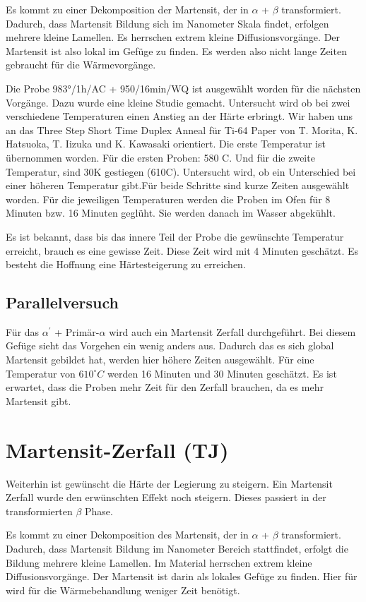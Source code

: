 Es kommt zu einer Dekomposition der Martensit, der in $\alpha$ + $\beta$ transformiert. Dadurch, dass Martensit Bildung sich im Nanometer Skala findet, erfolgen mehrere kleine Lamellen. Es herrschen extrem kleine Diffusionsvorgänge. Der Martensit ist also lokal im Gefüge zu finden. Es werden also nicht lange Zeiten gebraucht für die Wärmevorgänge.

Die Probe 983°/1h/AC + 950/16min/WQ ist ausgewählt worden für die nächsten Vorgänge. Dazu wurde eine kleine Studie gemacht. Untersucht wird ob bei zwei verschiedene Temperaturen einen Anstieg an der Härte erbringt. Wir haben uns an das Three Step Short Time Duplex Anneal für Ti-64 Paper von T. Morita, K. Hatsuoka, T. Iizuka und K. Kawasaki orientiert. Die erste Temperatur ist übernommen worden. Für die ersten Proben: 580 C. Und für die zweite Temperatur, sind 30K gestiegen (610C). Untersucht wird, ob ein Unterschied bei einer höheren Temperatur gibt.Für beide Schritte sind kurze Zeiten ausgewählt worden. Für die jeweiligen Temperaturen werden die Proben im Ofen für 8 Minuten bzw. 16 Minuten geglüht. Sie werden danach im Wasser abgekühlt. 

Es ist bekannt, dass bis das innere Teil der Probe die gewünschte Temperatur erreicht, brauch es eine gewisse Zeit. Diese Zeit wird mit 4 Minuten geschätzt. Es besteht die Hoffnung eine Härtesteigerung zu erreichen.



\subsection{Parallelversuch}

Für das $\alpha^\prime$ + Primär-$\alpha$ wird auch ein Martensit Zerfall durchgeführt. Bei diesem Gefüge sieht das Vorgehen ein wenig anders aus. Dadurch das es sich global Martensit gebildet hat, werden hier höhere Zeiten ausgewählt. Für eine Temperatur von $610^\circ C$ werden 16 Minuten und 30 Minuten geschätzt. Es ist erwartet, dass die Proben mehr Zeit für den Zerfall brauchen, da es mehr Martensit gibt. 


\section{Martensit-Zerfall (TJ)}
Weiterhin ist gewünscht die Härte der Legierung zu steigern. Ein Martensit Zerfall wurde den erwünschten Effekt noch steigern. Dieses passiert in der transformierten $\beta$ Phase.

Es kommt zu einer Dekomposition des Martensit, der in $\alpha$ + $\beta$ transformiert. Dadurch, dass Martensit Bildung im Nanometer Bereich stattfindet, erfolgt die Bildung mehrere kleine Lamellen. Im Material herrschen extrem kleine Diffusionsvorgänge. Der Martensit ist darin als lokales Gefüge zu finden. Hier für wird für die Wärmebehandlung weniger Zeit benötigt.

